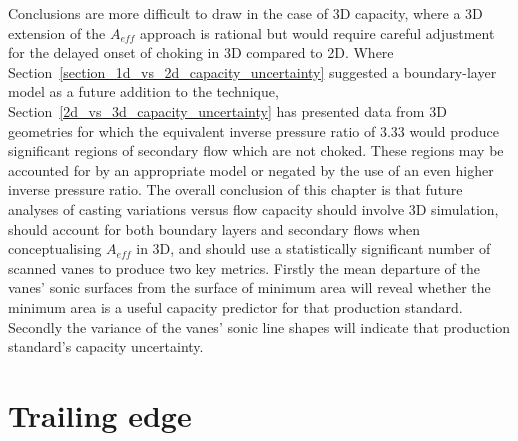 \documentclass[a4paper, 11pt, oneside]{report}
\begin{document}
Conclusions are more difficult to draw in the case of 3D capacity, where a 3D extension of the $A_{eff}$ approach is rational but would require careful adjustment for the delayed onset of choking in 3D compared to 2D. Where Section~\ref{section_1d_vs_2d_capacity_uncertainty} suggested a boundary-layer model as a future addition to the technique, Section~\ref{2d_vs_3d_capacity_uncertainty} has presented data from 3D geometries for which the equivalent inverse pressure ratio of $3.33$ would produce significant regions of secondary flow which are not choked. These regions may be accounted for by an appropriate model or negated by the use of an even higher inverse pressure ratio. The overall conclusion of this chapter is that future analyses of casting variations versus flow capacity should involve 3D simulation, should account for both boundary layers and secondary flows when conceptualising $A_{eff}$ in 3D, and should use a statistically significant number of scanned vanes to produce two key metrics. Firstly the mean departure of the vanes' sonic surfaces from the surface of minimum area will reveal whether the minimum area is a useful capacity predictor for that production standard. Secondly the variance of the vanes' sonic line shapes will indicate that production standard's capacity uncertainty.


\chapter{Trailing edge}
\label{chapter_trailing_edge}


\end{document}
